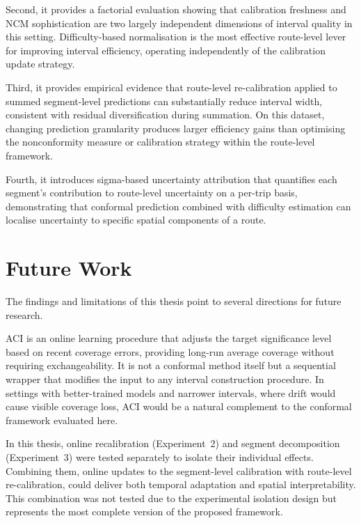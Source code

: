 \documentclass[12pt, a4paper, oneside]{report}
\begin{document}
Second, it provides a factorial evaluation showing that calibration freshness and NCM sophistication are two largely independent dimensions of interval quality in this setting. Difficulty-based normalisation is the most effective route-level lever for improving interval efficiency, operating independently of the calibration update strategy.

Third, it provides empirical evidence that route-level re-calibration applied to summed segment-level predictions can substantially reduce interval width, consistent with residual diversification during summation. On this dataset, changing prediction granularity produces larger efficiency gains than optimising the nonconformity measure or calibration strategy within the route-level framework.

Fourth, it introduces sigma-based uncertainty attribution that quantifies each segment's contribution to route-level uncertainty on a per-trip basis, demonstrating that conformal prediction combined with difficulty estimation can localise uncertainty to specific spatial components of a route.


\section{Future Work}
\label{sec:future_work}

The findings and limitations of this thesis point to several directions for future research.

ACI \cite{Gibbs2021} is an online learning procedure that adjusts the target significance level based on recent coverage errors, providing long-run average coverage without requiring exchangeability. It is not a conformal method itself but a sequential wrapper that modifies the input to any interval construction procedure. In settings with better-trained models and narrower intervals, where drift would cause visible coverage loss, ACI would be a natural complement to the conformal framework evaluated here.

In this thesis, online recalibration (Experiment~2) and segment decomposition (Experiment~3) were tested separately to isolate their individual effects. Combining them, online updates to the segment-level calibration with route-level re-calibration, could deliver both temporal adaptation and spatial interpretability. This combination was not tested due to the experimental isolation design but represents the most complete version of the proposed framework.
\end{document}
